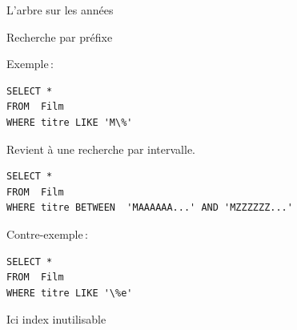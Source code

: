 \begin{frame}{L'arbre sur les années}

\end{frame}

\begin{frame}[fragile]{Recherche par préfixe}

Exemple\,:

\begin{verbatim}
SELECT *
FROM  Film
WHERE titre LIKE 'M\%'
\end{verbatim}

\vfill

Revient à une recherche par intervalle.\\

\vfill

\begin{verbatim}
SELECT *
FROM  Film
WHERE titre BETWEEN  'MAAAAAA...' AND 'MZZZZZZ...'
\end{verbatim}


\vfill

Contre-exemple\,:

\begin{verbatim}
SELECT *
FROM  Film
WHERE titre LIKE '\%e'
\end{verbatim}
\vfill

 Ici index inutilisable


\end{frame}




